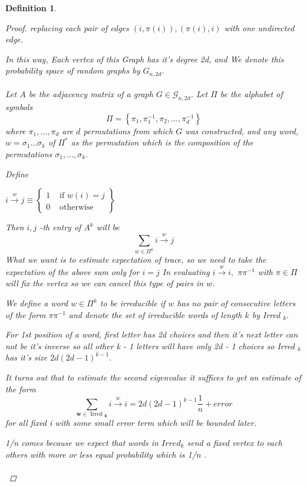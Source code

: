 \documentclass[oneside]{book}
\newtheorem{mydef}{Definition}
\begin{document}
\begin{mydef}
\begin{proof}
replacing each pair of edges $(i, \pi(i)), (\pi(i), i) $ with one undirected edge.\par In this way, Each vertex of this Graph has it's degree 2d, and  We denote
this probability space of random graphs by $G_{n,2d}$. \\\\
Let $A$ be the adjacency matrix of a graph $G \in \mathscr{G}_{n, 2 d}$. Let $\Pi$ be the alphabet of symbols
$$
\Pi=\left\{\pi_{1}, \pi_{1}^{-1}, \pi_{2}, \ldots, \pi_{d}^{-1}\right\}
$$
where  $\pi_{1}, \ldots, \pi_{d}$ are  $d$ permutations from which $G$ was constructed, and any word, $w=\sigma_{1} \ldots \sigma_{k}$ of $\Pi^{*}$ as the permutation which is the composition of the permutations $\sigma_{1}, \ldots, \sigma_{k} .$ \par
Define  \begin{center}
   $i \stackrel{w}{\rightarrow} j \equiv\left\{\begin{array}{ll}
1 & \text { if  }  w(i)=j \\
0 & \text { otherwise }
\end{array}\right\}$ 
\end{center}
Then  $i, j$ -th entry of $A^{k}$ will be 
$$
\sum_{w \in \Pi^{k}} i \stackrel{w}{\rightarrow} j
$$
What we want is  to estimate expectation of  trace, so we need to take the expectation of the above sum only for  $i = j$      
 In evaluating $i \stackrel{w}{\rightarrow} i,$  $\pi \pi^{-1}$ with $\pi \in \Pi $    will fix the vertex so we can cancel this type of pairs in  $w$.\par
 We define a word $w \in \Pi^{k}$ to be irreducible if $w$ has no pair of consecutive letters of the form $\pi \pi^{-1}$ and denote the set of irreducible words of length $k$ by Irred $_{k} .$\par
 For 1st position of a word, first letter has  2d choices and then it's next letter can not be it's inverse so all other k - 1 letters will have only 2d - 1 choices so
  Irred $_{k}$ has it's  size $2 d(2 d-1)^{k-1} .$ \par 
  It turns out that to estimate the second eigenvalue it suffices
to get an estimate of the form
$$
   \sum_{\boldsymbol{w} \in \text { Irred }_{\boldsymbol{k}}} i \stackrel{w}{\rightarrow} i=2 d(2 d-1)^{k-1} \frac{1}{n} + error 
$$
for all fixed i with some small error term which will be bounded later.\par
 1/n comes because we expect  that words in $Irred_{k} $ send a fixed vertex to each  others with more or less equal probability which is 1/n . \\\\

\end{proof}
\end{mydef}
\end{document}

